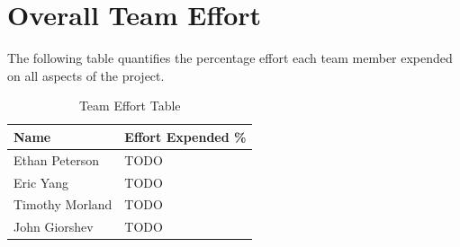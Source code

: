 \documentclass[letterpaper,11pt]{article}
\begin{document}
\section{Overall Team Effort}
The following table quantifies the percentage effort each team member expended
on all aspects of the project.


\begin{table}[H]
  \caption{Team Effort Table}
  \centering
  \begin{tabularx}{10cm}{l|l}
    \textbf{Name} & \textbf{Effort Expended \%}\\
    \hline
    Ethan Peterson & TODO \\
    \hline
    Eric Yang & TODO \\
    \hline
    Timothy Morland & TODO \\
    \hline
    John Giorshev & TODO \\
  \end{tabularx} 
\end{table}
\newpage




\newpage
{}

\pagestyle{empty}
\end{document}
